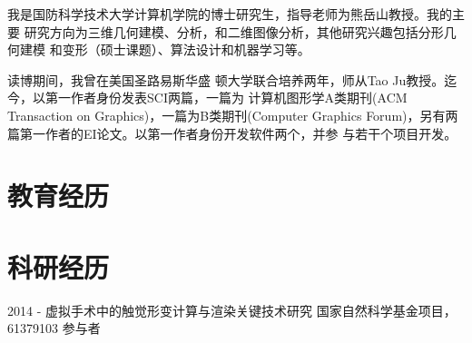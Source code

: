 \documentclass[20pt]{article} %
\begin{document}
\begin{flushleft}
我是国防科学技术大学计算机学院的博士研究生，指导老师为熊岳山教授。我的主要
研究方向为三维几何建模、分析，和二维图像分析，其他研究兴趣包括分形几何建模
和变形（硕士课题）、算法设计和机器学习等。

读博期间，我曾在美国圣路易斯华盛
顿大学联合培养两年，师从Tao Ju教授。迄今，以第一作者身份发表SCI两篇，一篇为
计算机图形学A类期刊(ACM Transaction on Graphics)，一篇为B类期刊(Computer
Graphics Forum)，另有两篇第一作者的EI论文。以第一作者身份开发软件两个，并参
与若干个项目开发。
\end{flushleft}

\section{教育经历}



\section{科研经历}
\job
{2014 - }{}
{虚拟手术中的触觉形变计算与渲染关键技术研究}
{国家自然科学基金项目，61379103}
{参与者}
\end{document}
